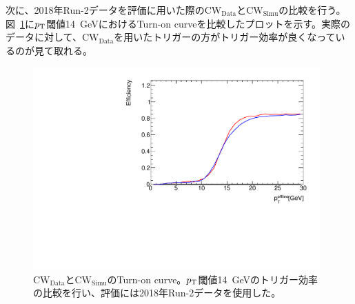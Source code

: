 次に、2018年Run-2データを評価に用いた際の$\mathrm{CW_{Data}}$と$\mathrm{CW_{Simu}}$の比較を行う。図~\ref{fig:v06v07}に$p_{\rm{T}}$閾値14~GeVにおけるTurn-on curveを比較したプロットを示す。実際のデータに対して、$\mathrm{CW_{Data}}$を用いたトリガーの方がトリガー効率が良くなっているのが見て取れる。
\begin{figure}[tb]
  \centering
  \includegraphics[clip, width=11cm]{fig/4/v06vsv07_MU14.pdf}
  \caption{$\mathrm{CW_{Data}}$と$\mathrm{CW_{Simu}}$のTurn-on curve。$p_{\rm{T}}$閾値14~GeVのトリガー効率の比較を行い、評価には2018年Run-2データを使用した。}
  \label{fig:v06v07}
\end{figure}

